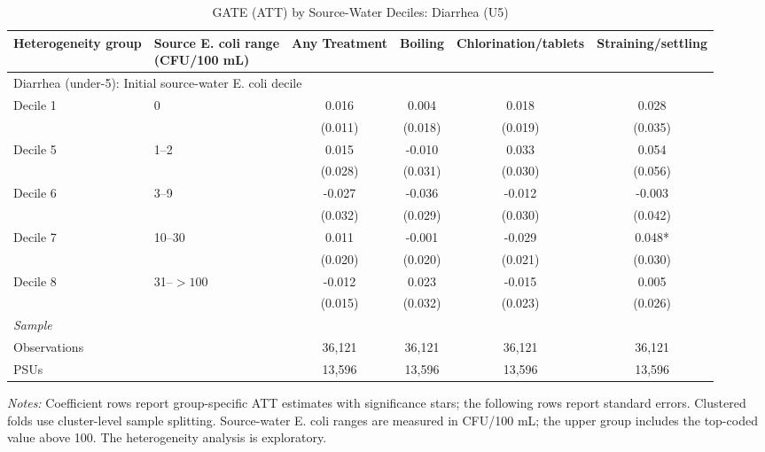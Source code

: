 \begin{landscape}
\begin{table}[p]
\centering
\caption{GATE (ATT) by Source-Water Deciles: Diarrhea (U5)}
\label{tab:table_gate_main_deciles-diarrhea}
\scriptsize\setlength{\tabcolsep}{4pt}
\begin{adjustbox}{max width=\linewidth, center}
\begin{tabular}{llcccc}
\toprule
Heterogeneity group & \shortstack{Source E. coli range\\(CFU/100 mL)} & Any Treatment & Boiling & Chlorination/tablets & Straining/settling \\
\midrule
\multicolumn{6}{l}{Diarrhea (under-5): Initial source-water E. coli decile} \\
Decile 1 & 0 & 0.016 & 0.004 & 0.018 & 0.028 \\
 &  & (0.011) & (0.018) & (0.019) & (0.035) \\
Decile 5 & 1--2 & 0.015 & -0.010 & 0.033 & 0.054 \\
 &  & (0.028) & (0.031) & (0.030) & (0.056) \\
Decile 6 & 3--9 & -0.027 & -0.036 & -0.012 & -0.003 \\
 &  & (0.032) & (0.029) & (0.030) & (0.042) \\
Decile 7 & 10--30 & 0.011 & -0.001 & -0.029 & 0.048* \\
 &  & (0.020) & (0.020) & (0.021) & (0.030) \\
Decile 8 & 31--$>100$ & -0.012 & 0.023 & -0.015 & 0.005 \\
 &  & (0.015) & (0.032) & (0.023) & (0.026) \\
\multicolumn{6}{l}{\textit{Sample}} \\
\quad Observations &  & 36,121 & 36,121 & 36,121 & 36,121 \\
\quad PSUs &  & 13,596 & 13,596 & 13,596 & 13,596 \\
\bottomrule
\end{tabular}
\end{adjustbox}
\par\vspace{3pt}
\begin{minipage}{\linewidth}\footnotesize \textit{Notes:} Coefficient rows report group-specific ATT estimates with significance stars; the following rows report standard errors. Clustered folds use cluster-level sample splitting. Source-water E. coli ranges are measured in CFU/100 mL; the upper group includes the top-coded value above 100. The heterogeneity analysis is exploratory.\end{minipage}
\end{table}
\end{landscape}